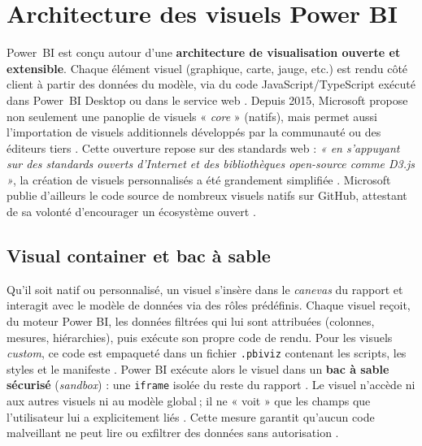 \section{Architecture des visuels Power BI}
\label{sec:archi-powerbi}

Power~BI est conçu autour d’une \textbf{architecture de visualisation ouverte
et extensible}.  
Chaque élément visuel (graphique, carte, jauge, etc.) est rendu côté client
à partir des données du modèle, via du code JavaScript/TypeScript exécuté
dans Power~BI Desktop ou dans le service web \parencite{MicrosoftOpenVis2015}.  
Depuis 2015, Microsoft propose non seulement une panoplie de visuels
« \emph{core} » (natifs), mais permet aussi l’importation de visuels
additionnels développés par la communauté ou des éditeurs tiers
\parencite{MicrosoftMarketplace2016}.  
Cette ouverture repose sur des standards web : \emph{« en s’appuyant sur des
standards ouverts d’Internet et des bibliothèques open-source comme D3.js »},
la création de visuels personnalisés a été grandement simplifiée
\parencite{MicrosoftD3Blog2017}.  
Microsoft publie d’ailleurs le code source de nombreux visuels natifs sur
GitHub, attestant de sa volonté d’encourager un écosystème ouvert
\parencite{GitHubPowerBISamples2024}.

\subsection{Visual container et bac à sable}
\label{subsec:sandbox}

Qu’il soit natif ou personnalisé, un visuel s’insère dans le \emph{canevas}
du rapport et interagit avec le modèle de données via des rôles prédéfinis.
Chaque visuel reçoit, du moteur Power BI, les données filtrées qui lui sont
attribuées (colonnes, mesures, hiérarchies), puis exécute son propre code de
rendu.  
Pour les visuels \emph{custom}, ce code est empaqueté dans un fichier
\verb|.pbiviz| contenant les scripts, les styles et le manifeste
\parencite{MicrosoftPbivizDocs2023}.  
Power BI exécute alors le visuel dans un \textbf{bac à sable sécurisé}
(\emph{sandbox}) : une \texttt{iframe} isolée du reste du rapport
\parencite{OkVizSandbox2022}.  
Le visuel n’accède ni aux autres visuels ni au modèle global ; il ne « voit »
que les champs que l’utilisateur lui a explicitement liés
\parencite{OkVizSandbox2022}.  
Cette mesure garantit qu’aucun code malveillant ne peut lire ou exfiltrer des
données sans autorisation \parencite{MediumSecurityPBI2023}.


